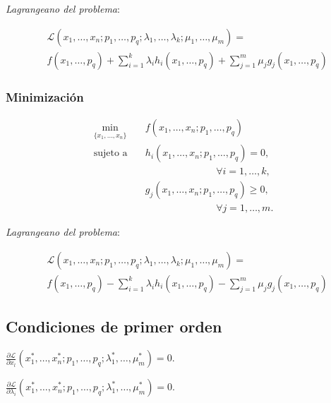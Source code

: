 \documentclass[8pt,a4paper]{extarticle}
\begin{document}
\begin{multicols}{3}
	\emph{Lagrangeano del problema}:

	\begin{equation*}
		\begin{aligned}
			 & \mathcal{L}(x_1, \ldots, x_n; p_1, \ldots, p_q; \lambda_1, \ldots, \lambda_k; \mu_1, \ldots, \mu_m) =            \\
			 & f(x_1,\ldots, p_q) + \sum_{i=1}^{k}\lambda_i h_i (x_1, \ldots, p_q) + \sum_{j=1}^{m}\mu_j g_j (x_1, \ldots, p_q)
		\end{aligned}
	\end{equation*}

	\subsubsection*{Minimización}

	\begin{equation*}
		\begin{aligned}
			\min_{\{x_1, \ldots, x_n\}}\  & f(x_1, \ldots, x_n; p_1, \ldots, p_q)          \\
			\text{sujeto a} \quad         & h_i(x_1, \ldots, x_n; p_1, \ldots, p_q) = 0,   \\ & \qquad \qquad \qquad \quad \, \forall i = 1, \ldots, k, \\
			                              & g_j(x_1, \ldots, x_n; p_1, \ldots, p_q) \ge 0, \\ & \qquad \qquad \qquad \quad \, \forall j = 1, \ldots, m.
		\end{aligned}
	\end{equation*}

	\emph{Lagrangeano del problema}:

	\begin{equation*}
		\begin{aligned}
			 & \mathcal{L}(x_1, \ldots, x_n; p_1, \ldots, p_q; \lambda_1, \ldots, \lambda_k; \mu_1, \ldots, \mu_m) =            \\
			 & f(x_1,\ldots, p_q) - \sum_{i=1}^{k}\lambda_i h_i (x_1, \ldots, p_q) - \sum_{j=1}^{m}\mu_j g_j (x_1, \ldots, p_q)
		\end{aligned}
	\end{equation*}

	\sectionbreak

	\subsection*{Condiciones de primer orden}

	\begin{bulletlist}
		\item $\displaystyle \frac{\partial \mathcal{L}}{\partial x_l} (x_{1}^{*}, \ldots, x_{n}^{*}; p_1, \ldots, p_q; \lambda_{1}^{*}, \ldots, \mu_{m}^{*}) = 0$.
		\item $\displaystyle \frac{\partial \mathcal{L}}{\partial \lambda_i} (x_{1}^{*}, \ldots, x_{n}^{*}; p_1, \ldots, p_q; \lambda_{1}^{*}, \ldots, \mu_{m}^{*}) = 0$.
	\end{bulletlist}


\end{multicols}
\end{document}

